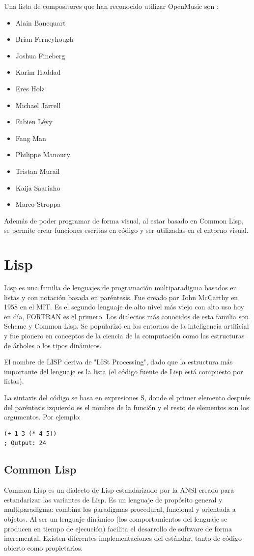 \documentclass[a4paper,openright,12pt]{book}
\begin{document}
Una lista de compositores que han reconocido utilizar OpenMusic son \cite{wiki:openmusic}:

\begin{itemize}
\item Alain Bancquart
\item Brian Ferneyhough
\item Joshua Fineberg
\item Karim Haddad
\item Eres Holz
\item Michael Jarrell
\item Fabien Lévy
\item Fang Man
\item Philippe Manoury
\item Tristan Murail
\item Kaija Saariaho
\item Marco Stroppa
\end{itemize}

Además de poder programar de forma visual, al estar basado en Common Lisp, se permite crear funciones escritas en código y ser utilizadas en el entorno visual.
\section{Lisp}
Lisp es una familia de lenguajes de programación multiparadigma basados en listas y con notación basada en paréntesis. Fue creado por John McCarthy en 1958 en el MIT. Es el segundo lenguaje de alto nivel más viejo con alto uso hoy en día, FORTRAN es el primero. Los dialectos más conocidos de esta familia son Scheme y Common Lisp. Se popularizó en los entornos de la inteligencia artificial y fue pionero en conceptos de la ciencia de la computación como las estructuras de árboles o los tipos dinámicos.

El nombre de LISP deriva de "LISt Processing", dado que la estructura más importante del lenguaje es la lista (el código fuente de Lisp está compuesto por listas).\cite{wiki:lisp}

La sintaxis del código se basa en expresiones S, donde el primer elemento después del paréntesis izquierdo es el nombre de la función y el resto de elementos son los argumentos. Por ejemplo:

\lstset{language=Lisp}
\begin{lstlisting}
(+ 1 3 (* 4 5))
; Output: 24
\end{lstlisting}


\subsection{Common Lisp}
Common Lisp es un dialecto de Lisp estandarizado por la ANSI creado para estandarizar las variantes de Lisp. Es un lenguaje de propósito general y multiparadigma: combina los paradigmas procedural, funcional y orientada a objetos. Al ser un lenguaje dinámico (los comportamientos del lenguaje se producen en tiempo de ejecución) facilita el desarrollo de software de forma incremental. Existen diferentes implementaciones del estándar, tanto de código abierto como propietarios. \cite{wiki:commonlisp} 
\end{document}
